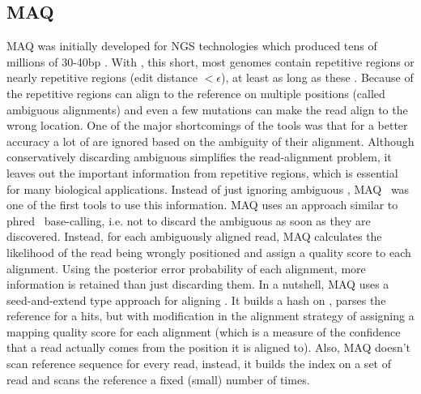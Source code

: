 \subsection{MAQ~\citep{maq}} \label{maq}
MAQ was initially developed for NGS technologies which produced tens of millions of 30-40bp \reads. With \reads, this short, most genomes contain repetitive regions or nearly repetitive regions (edit distance $< \epsilon$), at least as long as these \reads. Because of the repetitive regions \reads can align to the reference on multiple positions (called ambiguous alignments) and even a few mutations can make the read align to the wrong location. One of the major shortcomings of the \ra tools was that for a better accuracy a lot of \reads are ignored based on the ambiguity of their alignment. Although conservatively discarding ambiguous \reads simplifies the read-alignment problem, it leaves out the important information from repetitive regions, which is essential for many biological applications. Instead of just ignoring ambiguous \reads, MAQ~\citep{maq} was one of the first tools to use this information. MAQ uses an approach similar to phred~\citep{ewing1998base} base-calling, i.e. not to discard the ambiguous \reads as soon as they are discovered. Instead, for each ambiguously aligned read, MAQ calculates the likelihood of the read being wrongly positioned and assign a quality score to each alignment. Using the posterior error probability of each alignment, more information is retained than just discarding them. In a nutshell, MAQ uses a seed-and-extend type approach for aligning \reads. It builds a hash on \reads, parses the reference for a hits, but with modification in the alignment strategy of assigning a mapping quality score for each alignment (which is a measure of the confidence that a read actually comes from the position it is aligned to). Also, MAQ doesn't scan reference sequence for every read, instead, it builds the index on a set of read and scans the reference a fixed (small) number of times.

